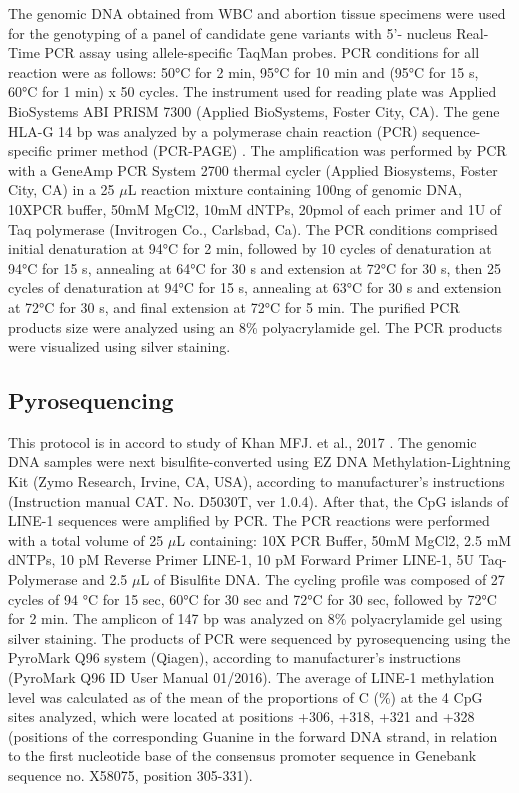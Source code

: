 \documentclass[10pt,letterpaper]{article}
\begin{document}
\noindent The genomic DNA obtained from WBC and abortion tissue specimens were used for the genotyping of a panel of candidate gene variants with 5’- nucleus Real-Time PCR assay using allele-specific TaqMan probes. PCR conditions for all reaction were as follows: 50\si{\degree}C for 2 min, 95\si{\degree}C for 10 min and (95\si{\degree}C for 15 s, 60\si{\degree}C for 1 min) x 50 cycles. The instrument used for reading plate was Applied BioSystems ABI PRISM 7300 (Applied BioSystems, Foster City, CA). The gene HLA-G 14 bp was analyzed by a polymerase chain reaction (PCR) sequence-specific primer method (PCR-PAGE) \cite{castelli2014insights}. The amplification was performed by PCR with a GeneAmp PCR System 2700 thermal cycler (Applied Biosystems, Foster City, CA) in a 25 $\mu$L reaction mixture containing 100ng of genomic DNA, 10XPCR buffer, 50mM MgCl2, 10mM dNTPs, 20pmol of each primer and 1U of Taq polymerase (Invitrogen Co., Carlsbad, Ca). The PCR conditions comprised initial denaturation at 94\si{\degree}C for 2 min, followed by 10 cycles of denaturation at 94\si{\degree}C for 15 s, annealing at 64\si{\degree}C for 30 s and extension at 72\si{\degree}C for 30 s, then 25 cycles of denaturation at 94\si{\degree}C for 15 s, annealing at 63\si{\degree}C for 30 s and extension at 72\si{\degree}C for 30 s, and final extension at 72\si{\degree}C for 5 min. The purified PCR products size were analyzed using an 8\% polyacrylamide gel. The PCR products were visualized using silver staining.  %

\subsection*{Pyrosequencing}

\noindent This protocol is in accord to study of Khan MFJ. et al., 2017 \cite{khan2018evaluating}. The genomic DNA samples were next bisulfite-converted using EZ DNA Methylation-Lightning Kit (Zymo Research, Irvine, CA, USA), according to manufacturer's instructions (Instruction manual CAT. No. D5030T, ver 1.0.4). After that, the CpG islands of LINE-1 sequences were amplified by PCR. The PCR reactions were performed with a total volume of 25 $\mu$L containing: 10X PCR Buffer, 50mM MgCl2, 2.5 mM dNTPs, 10 pM Reverse Primer LINE-1, 10 pM Forward Primer LINE-1, 5U Taq-Polymerase and 2.5 $\mu$L of Bisulfite DNA. The cycling profile was composed of 27 cycles of 94 \si{\celsius} for 15 sec, 60\si{\celsius} for 30 sec and 72\si{\celsius} for 30 sec, followed by 72\si{\celsius} for 2 min. The amplicon of 147 bp was analyzed on 8\% polyacrylamide gel using silver staining. The products of PCR were sequenced by pyrosequencing using the PyroMark Q96 system (Qiagen), according to manufacturer’s instructions (PyroMark Q96 ID User Manual 01/2016). The average of LINE-1 methylation level was calculated as of the mean of the proportions of C (\%) at the 4 CpG sites analyzed, which were located at positions +306, +318, +321 and +328 (positions of the corresponding Guanine in the forward DNA strand, in relation to the first nucleotide base of the consensus promoter sequence in Genebank sequence no. X58075, position 305-331).
\end{document}
